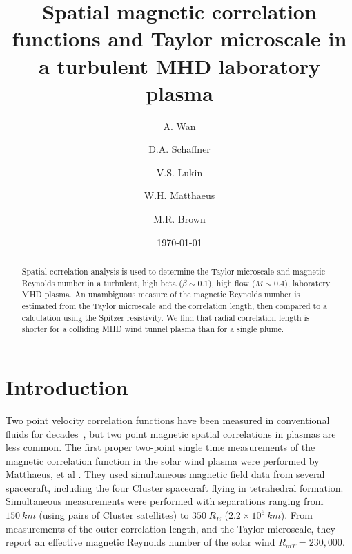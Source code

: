 \documentclass[aip,prl,amsmath,amssymb,reprint,superscriptaddress]{revtex4-1} %
\begin{document}
\title{Spatial magnetic correlation functions and Taylor microscale in a turbulent MHD laboratory plasma}

\author{A. Wan}
\author{D.A. Schaffner}
\author{V.S. Lukin}
\author{W.H. Matthaeus}
\author{M.R. Brown}
\date{\today}
\begin{abstract}
Spatial correlation analysis is used to determine the Taylor microscale and magnetic Reynolds number in a turbulent, high beta ($\beta \sim 0.1$), high flow ($M \sim 0.4$), laboratory MHD plasma.  An unambiguous measure of the magnetic Reynolds number is estimated from the Taylor microscale and the correlation length, then compared to a calculation using the Spitzer resistivity.  We find that radial correlation length is shorter for a colliding MHD wind tunnel plasma than for a single plume.  
\end{abstract}

\maketitle

\section{Introduction}

Two point velocity correlation functions have been measured in conventional fluids for decades~\cite{frisch95,Belmabrouk98}, but two point magnetic spatial correlations in plasmas are less common.  The first proper two-point single time measurements of the magnetic correlation function in the solar wind plasma were performed by Matthaeus, et al \cite{Matthaeus05}.  They used simultaneous magnetic field data from several spacecraft, including the four Cluster spacecraft flying in tetrahedral formation.  Simultaneous measurements were performed with separations ranging from $150~km$ (using pairs of Cluster satellites) to $350~R_E$ ($2.2 \times 10^6~km$).  From measurements of the outer correlation length, and the Taylor microscale, they report an effective magnetic Reynolds number of the solar wind $R_{mT}  = 230,000$.
\end{document}
